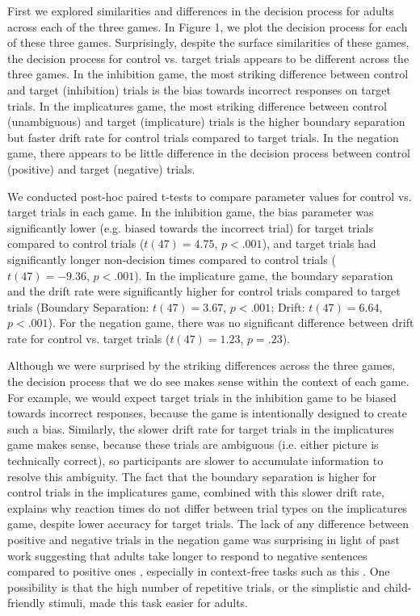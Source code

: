 \documentclass[10pt,letterpaper]{article}
\begin{document}
First we explored similarities and differences in the decision process for adults across each of the three games.  In Figure 1, we plot the decision process for each of these three games.  Surprisingly, despite the surface similarities of these games, the decision process for control vs. target trials appears to be different across the three games.  In the inhibition game, the most striking difference between control and target (inhibition) trials is the bias towards incorrect responses on target trials.  In the implicatures game, the most striking difference between control (unambiguous) and target (implicature) trials is the higher boundary separation but faster drift rate for control trials compared to target trials.  In the negation game, there appears to be little difference in the decision process between control (positive) and target (negative) trials.

We conducted post-hoc paired t-tests to compare parameter values for control vs. target trials in each game.  In the inhibition game, the bias parameter was significantly lower (e.g. biased towards the incorrect trial) for target trials compared to control trials ($t(47) = 4.75$, $p< .001$), and target trials had significantly longer non-decision times compared to control trials ($t(47) = -9.36$, $p< .001$).  In the implicature game, the boundary separation and the drift rate were significantly higher for control trials compared to target trials (Boundary Separation: $t(47) = 3.67$, $p< .001$; Drift: $t(47) = 6.64$, $p< .001$).  For the negation game, there was no significant difference between drift rate for control vs. target trials ($t(47) = 1.23$, $p = .23$).  

Although we were surprised by the striking differences across the three games, the decision process that we do see makes sense within the context of each game.  For example, we would expect target trials in the inhibition game to be biased towards incorrect responses, because the game is intentionally designed to create such a bias.  Similarly, the slower drift rate for target trials in the implicatures game makes sense, because these trials are ambiguous (i.e. either picture is technically correct), so participants are slower to accumulate information to resolve this ambiguity. The fact that the boundary separation is higher for control trials in the implicatures game, combined with this slower drift rate, explains why reaction times do not differ between trial types on the implicatures game, despite lower accuracy for target trials.  The lack of any difference between positive and negative trials in the negation game was surprising in light of past work suggesting that adults take longer to respond to negative sentences compared to positive ones \cite{hclark1972}, especially in context-free tasks such as this \cite{nordmeyer2014a}.  One possibility is that the high number of repetitive trials, or the simplistic and child-friendly stimuli, made this task easier for adults.
\end{document}
